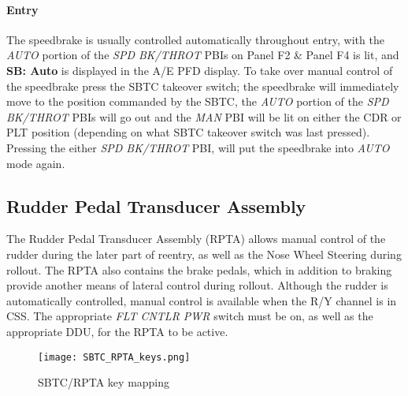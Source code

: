 \documentclass[Space_Shuttle_Vessel_Manual.tex]{subfiles}
\begin{document}
\begin{multicols*}{2}
\paragraph{Entry}
\label{sec:entry}
The speedbrake is usually controlled automatically throughout entry, with the \textit{AUTO} portion of the \textit{SPD BK/THROT} PBIs on Panel F2 \& Panel F4 is lit, and \textbf{SB: Auto} is displayed in the A/E PFD display. To take over manual control of the speedbrake press the SBTC takeover switch; the speedbrake will immediately move to the position commanded by the SBTC, the \textit{AUTO} portion of the \textit{SPD BK/THROT} PBIs will go out and the \textit{MAN} PBI will be lit on either the CDR or PLT position (depending on what SBTC takeover switch was last pressed). Pressing the either \textit{SPD BK/THROT} PBI, will put the speedbrake into \textit{AUTO} mode again.

\subsection{Rudder Pedal Transducer Assembly}
The Rudder Pedal Transducer Assembly (RPTA) allows manual control of the rudder during the later part of reentry, as well as the Nose Wheel Steering during rollout. The RPTA also contains the brake pedals, which in addition to braking provide another means of lateral control during rollout. Although the rudder is automatically controlled, manual control is available when the R/Y channel is in CSS. The appropriate \textit{FLT CNTLR PWR} switch must be on, as well as the appropriate DDU, for the RPTA to be active.




\begin{figure}[H]
  \texttt{[image: SBTC\_RPTA\_keys.png]}
  \caption{SBTC/RPTA key mapping}
  \label{fig:SBTC_RPTA_keys}
\end{figure}



\end{multicols*}
\end{document}
